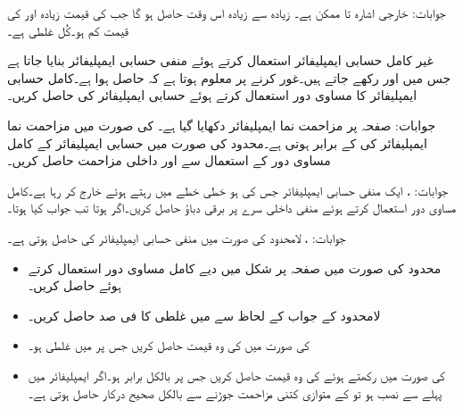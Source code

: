 جوابات: خارجی اشارہ  تا  ممکن ہے۔   زیادہ سے زیادہ  اس وقت حاصل ہو گا جب   کی قیمت  زیادہ اور  کی قیمت   کم ہو۔کُل غلطی  ہے۔

غیر کامل حسابی ایمپلیفائر استعمال کرتے ہوئے  منفی حسابی ایمپلیفائر بنایا جاتا ہے جس میں  اور  رکھے جاتے ہیں۔غور کرنے پر معلوم ہوتا ہے کہ  حاصل ہوا ہے۔کامل حسابی ایمپلیفائر کا مساوی دور استعمال کرتے ہوئے  حسابی ایمپلیفائر کی  حاصل کریں۔

جوابات: 
صفحہ  پر مزاحمت نما ایمپلیفائر دکھایا گیا ہے۔ کی صورت میں مزاحمت نما ایمپلیفائر کی
  کے برابر ہوتی ہے۔محدود  کی صورت میں  حسابی ایمپلیفائر کے کامل مساوی دور کے استعمال سے  اور داخلی مزاحمت حاصل کریں۔

جوابات: ، 
ایک منفی حسابی ایمپلیفائر جس کی  ہو خطی خطے میں رہتے ہوئے  خارج کر رہا ہے۔کامل مساوی دور استعمال کرتے ہوئے منفی داخلی سرے  پر برقی دباؤ حاصل کریں۔اگر  ہوتا تب جواب کیا ہوتا۔
	
جوابات: ،   
لامحدود  کی صورت میں منفی حسابی ایمپلیفائر کی  حاصل ہوتی ہے۔
\begin{itemize}
\item
محدود   کی صورت میں صفحہ  پر شکل  میں دیے  کامل مساوی دور استعمال کرتے ہوئے  حاصل کریں۔ 
\item
لامحدود  کے جواب کے  لحاظ  سے  میں غلطی کا فی صد حاصل کریں۔
\item
{} کی صورت میں  کی وہ قیمت حاصل کریں جس پر  میں غلطی ہو۔
\item
{} کی صورت میں  رکھتے ہوئے  کی وہ قیمت حاصل کریں جس پر  بالکل برابر  ہو۔اگر ایمپلیفائر میں  پہلے سے نصب ہو تو  کے متوازی کتنی مزاحمت جوڑنے سے  بالکل صحیح درکار  حاصل ہوتی ہے۔

\end{itemize}

